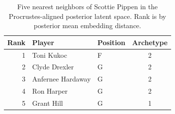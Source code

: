 \begin{table}[htbp]
  \centering\small
  \begin{tabular}{rllc}
    \toprule
    Rank & Player & Position & Archetype \\
    \midrule
    1 & Toni Kukoc & F & 2 \\
    2 & Clyde Drexler & G & 2 \\
    3 & Anfernee Hardaway & G & 2 \\
    4 & Ron Harper & G & 2 \\
    5 & Grant Hill & G & 1 \\
    \bottomrule
  \end{tabular}
  \caption{Five nearest neighbors of Scottie Pippen in the Procrustes-aligned posterior latent space. Rank is by posterior mean embedding distance.}
  \label{tab:Scottie_Pippen_neighbors}
\end{table}

